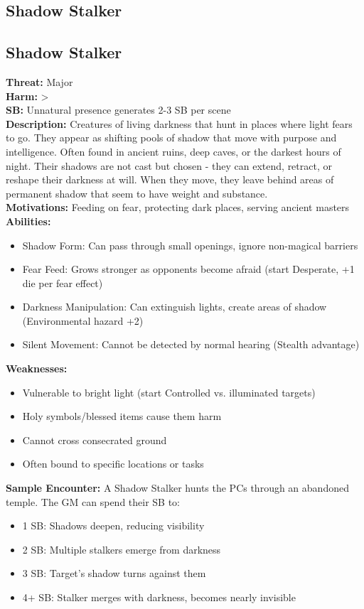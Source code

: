 \documentclass[11pt]{article}
\newenvironment{monsterentry}[1]{%
  \begin{mdframed}[backgroundcolor=shadecolor, linewidth=0pt, leftmargin=0pt, rightmargin=0pt]%
  \subsection*{#1}%
}{%
  \end{mdframed}%
}
\begin{document}
\subsection{Shadow Stalker}

\begin{monsterentry}{Shadow Stalker}
\textbf{Threat:} Major \\
\textbf{Harm:} \textgreater \\
\textbf{SB:} Unnatural presence generates 2-3 SB per scene \\
\textbf{Description:} Creatures of living darkness that hunt in places where light fears to go. They appear as shifting pools of shadow that move with purpose and intelligence. Often found in ancient ruins, deep caves, or the darkest hours of night. Their shadows are not cast but chosen - they can extend, retract, or reshape their darkness at will. When they move, they leave behind areas of permanent shadow that seem to have weight and substance. \\
\textbf{Motivations:} Feeding on fear, protecting dark places, serving ancient masters \\
\textbf{Abilities:}
\begin{itemize}
    \item Shadow Form: Can pass through small openings, ignore non-magical barriers
    \item Fear Feed: Grows stronger as opponents become afraid (start Desperate, +1 die per fear effect)
    \item Darkness Manipulation: Can extinguish lights, create areas of shadow (Environmental hazard +2)
    \item Silent Movement: Cannot be detected by normal hearing (Stealth advantage)
\end{itemize}
\textbf{Weaknesses:}
\begin{itemize}
    \item Vulnerable to bright light (start Controlled vs. illuminated targets)
    \item Holy symbols/blessed items cause them harm
    \item Cannot cross consecrated ground
    \item Often bound to specific locations or tasks
\end{itemize}
\textbf{Sample Encounter:} A Shadow Stalker hunts the PCs through an abandoned temple. The GM can spend their SB to:
\begin{itemize}
    \item 1 SB: Shadows deepen, reducing visibility
    \item 2 SB: Multiple stalkers emerge from darkness
    \item 3 SB: Target's shadow turns against them
    \item 4+ SB: Stalker merges with darkness, becomes nearly invisible
\end{itemize}
\end{monsterentry}
\end{document}
